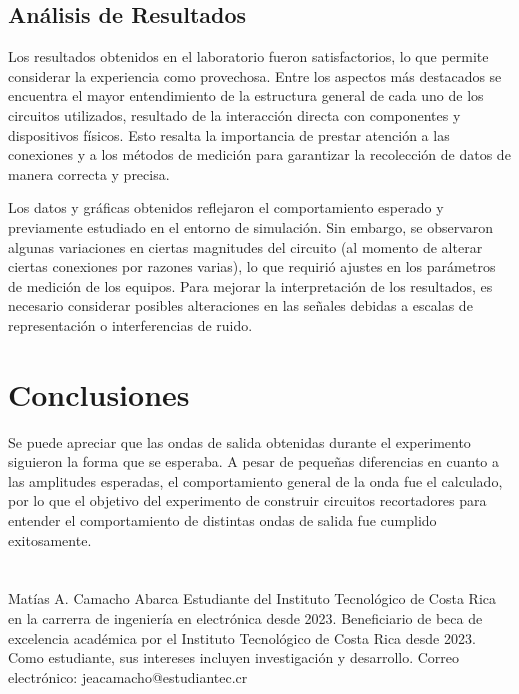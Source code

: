 \documentclass[journal]{IEEEtran}
\begin{document}
\subsection{Análisis de Resultados}
Los resultados obtenidos en el laboratorio fueron satisfactorios, lo que permite considerar la experiencia como provechosa. 
Entre los aspectos más destacados se encuentra el mayor entendimiento de la estructura general de cada uno de los circuitos utilizados, 
resultado de la interacción directa con componentes y dispositivos físicos. Esto resalta la importancia de prestar atención a las conexiones y a los 
métodos de medición para garantizar la recolección de datos de manera correcta y precisa.

Los datos y gráficas obtenidos reflejaron el comportamiento esperado y previamente estudiado en el entorno de simulación. 
Sin embargo, se observaron algunas variaciones en ciertas magnitudes del circuito (al momento de alterar ciertas conexiones por razones varias), 
lo que requirió ajustes en los parámetros de medición de los equipos. 
Para mejorar la interpretación de los resultados, es necesario considerar posibles alteraciones en las señales debidas a escalas de 
representación o interferencias de ruido.

\section{Conclusiones}
Se puede apreciar que las ondas de salida obtenidas durante el experimento siguieron la forma que se esperaba. A pesar de pequeñas diferencias
en cuanto a las amplitudes esperadas, el comportamiento general de la onda fue el calculado, por lo que el objetivo del experimento de construir circuitos recortadores
para entender el comportamiento de distintas ondas de salida fue cumplido exitosamente.

\appendices

\section{}

\begin{IEEEbiographynophoto}{Matías A. Camacho Abarca}
        Estudiante del Instituto Tecnológico de Costa Rica en la carrerra de ingeniería en electrónica desde
        2023. Beneficiario de beca de excelencia académica por el Instituto Tecnológico de
        Costa Rica desde 2023. Como estudiante, sus
        intereses incluyen investigación y desarrollo.
        Correo electrónico: jeacamacho@estudiantec.cr
\end{IEEEbiographynophoto}
\end{document}
